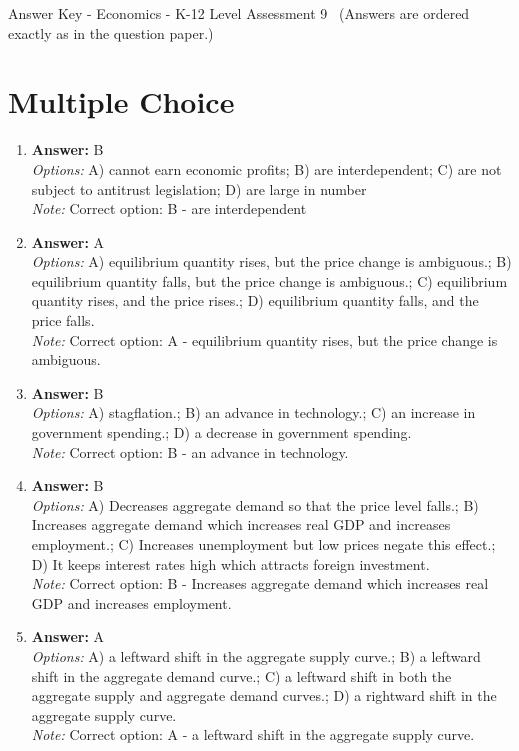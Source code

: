 \documentclass[12pt]{article}
\begin{document}
\begin{center}
Answer Key - Economics - K-12 Level Assessment 9 \
\small (Answers are ordered exactly as in the question paper.)
\end{center}

\section*{Multiple Choice}
\begin{enumerate}[label=\arabic*.]
\item \textbf{Answer:} B
\\ \textit{Options:} A) cannot earn economic profits; B) are interdependent; C) are not subject to antitrust legislation; D) are large in number
\\ \textit{Note:} Correct option: B - are interdependent
\item \textbf{Answer:} A
\\ \textit{Options:} A) equilibrium quantity rises, but the price change is ambiguous.; B) equilibrium quantity falls, but the price change is ambiguous.; C) equilibrium quantity rises, and the price rises.; D) equilibrium quantity falls, and the price falls.
\\ \textit{Note:} Correct option: A - equilibrium quantity rises, but the price change is ambiguous.
\item \textbf{Answer:} B
\\ \textit{Options:} A) stagflation.; B) an advance in technology.; C) an increase in government spending.; D) a decrease in government spending.
\\ \textit{Note:} Correct option: B - an advance in technology.
\item \textbf{Answer:} B
\\ \textit{Options:} A) Decreases aggregate demand so that the price level falls.; B) Increases aggregate demand which increases real GDP and increases employment.; C) Increases unemployment but low prices negate this effect.; D) It keeps interest rates high which attracts foreign investment.
\\ \textit{Note:} Correct option: B - Increases aggregate demand which increases real GDP and increases employment.
\item \textbf{Answer:} A
\\ \textit{Options:} A) a leftward shift in the aggregate supply curve.; B) a leftward shift in the aggregate demand curve.; C) a leftward shift in both the aggregate supply and aggregate demand curves.; D) a rightward shift in the aggregate supply curve.
\\ \textit{Note:} Correct option: A - a leftward shift in the aggregate supply curve.
\end{enumerate}
\end{document}
